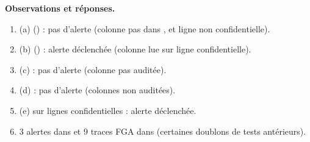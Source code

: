 \textbf{Observations et réponses.}
\begin{enumerate}
  \item (a)  () : pas d'alerte (colonne  pas dans , et ligne non confidentielle).
  \item (b)  () : alerte déclenchée (colonne  lue sur ligne confidentielle).
  \item (c)  : pas d'alerte (colonne  pas auditée).
  \item (d)  : pas d'alerte (colonnes non auditées).
  \item (e)  sur lignes confidentielles : alerte déclenchée.
  \item 3 alertes dans  et 9 traces FGA dans  (certaines doublons de tests antérieurs).
\end{enumerate}
